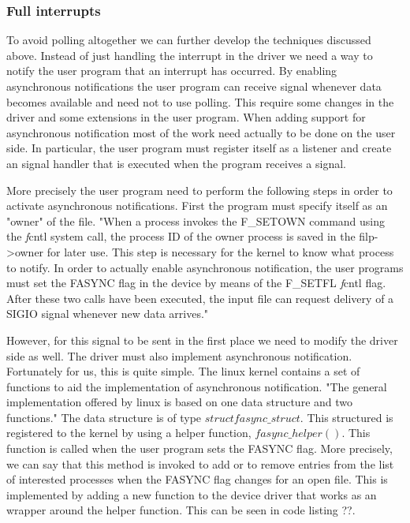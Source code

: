 \subsubsection{Full interrupts}
To avoid polling altogether we can further develop the techniques discussed above. Instead of just handling the interrupt in the driver we need a way to notify the user program that an interrupt has occurred. By enabling asynchronous notifications the user program can receive signal whenever data becomes available and need not to use polling. This require some changes in the driver and some extensions in the user program. When adding support for asynchronous notification most of the work need actually to be done on the user side. In particular, the user program must register itself as a listener and create an signal handler that is executed when the program receives a signal. 

More precisely the user program need to perform the following steps in order to activate asynchronous notifications. First the program must specify itself as an "owner" of the file. "When a process invokes the F\_SETOWN command using the {\emph fcntl} system call, the process ID of the owner process is saved in the filp->owner for later use. This step is necessary for the kernel to know what process to notify. In order to actually enable asynchronous notification, the user programs must set the FASYNC flag in the device by means of the F\_SETFL {\emph fcntl} flag. After these two calls have been executed, the input file can request delivery of a SIGIO signal whenever new data arrives."

However, for this signal to be sent in the first place we need to modify the driver side as well. The driver must also implement asynchronous notification. Fortunately for us, this is quite simple. The linux kernel contains a set of functions to aid the implementation of asynchronous notification. "The general implementation offered by linux is based on one data structure and two functions." The data structure is of type $struct fasync\_struct$. This structured  is registered to the kernel by using a helper function, $fasync\_helper()$. This function is called when the user program sets the FASYNC flag. More precisely, we can say that this method is invoked to add or to remove entries from the list of interested processes when the FASYNC flag changes for an open file. This is implemented by adding a new function to the device driver that works as an wrapper around the helper function. This can be seen in code listing ??.


